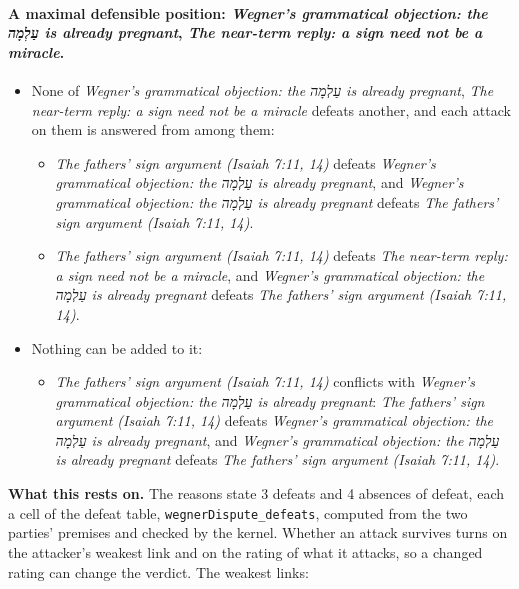 \documentclass[11pt]{article}
\begin{document}
\paragraph{A maximal defensible position: \emph{Wegner's grammatical objection: the עַלְמָה is already pregnant}, \emph{The near-term reply: a sign need not be a miracle}.}
\begin{itemize}
\item None of \emph{Wegner's grammatical objection: the עַלְמָה is already pregnant}, \emph{The near-term reply: a sign need not be a miracle} defeats another, and each attack on them is answered from among them:
\begin{itemize}
\item \emph{The fathers' sign argument (Isaiah 7:11, 14)} defeats \emph{Wegner's grammatical objection: the עַלְמָה is already pregnant}, and \emph{Wegner's grammatical objection: the עַלְמָה is already pregnant} defeats \emph{The fathers' sign argument (Isaiah 7:11, 14)}.
\item \emph{The fathers' sign argument (Isaiah 7:11, 14)} defeats \emph{The near-term reply: a sign need not be a miracle}, and \emph{Wegner's grammatical objection: the עַלְמָה is already pregnant} defeats \emph{The fathers' sign argument (Isaiah 7:11, 14)}.
\end{itemize}
\item Nothing can be added to it:
\begin{itemize}
\item \emph{The fathers' sign argument (Isaiah 7:11, 14)} conflicts with \emph{Wegner's grammatical objection: the עַלְמָה is already pregnant}: \emph{The fathers' sign argument (Isaiah 7:11, 14)} defeats \emph{Wegner's grammatical objection: the עַלְמָה is already pregnant}, and \emph{Wegner's grammatical objection: the עַלְמָה is already pregnant} defeats \emph{The fathers' sign argument (Isaiah 7:11, 14)}.
\end{itemize}
\end{itemize}
\par\noindent\textbf{What this rests on.} The reasons state 3 defeats and 4 absences of defeat, each a cell of the defeat table, \texttt{wegner\allowbreak{}Dispute\_\allowbreak{}defeats}, computed from the two parties' premises and checked by the kernel. Whether an attack survives turns on the attacker's weakest link and on the rating of what it attacks, so a changed rating can change the verdict. The weakest links:
\end{document}
